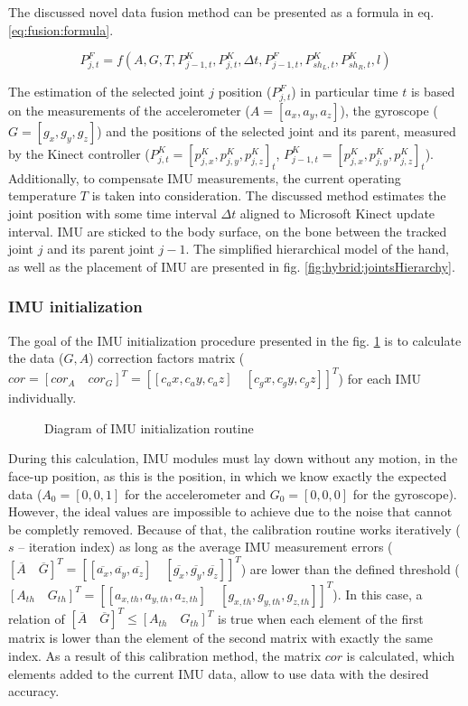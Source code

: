 \documentclass[sensors,article,submit,moreauthors,pdftex,10pt,a4paper]{mdpi}
\begin{document}
	The discussed novel data fusion method can be presented as a formula in eq. \ref{eq:fusion:formula}.
		
	\begin{equation}
		P^F_{j,t} = f(A,G,T,P_{j-1,t}^K,P_{j,t}^K,\Delta t, P^F_{j-1,t}, P^K_{sh_L,t},P^K_{sh_R,t},l) 
		\label{eq:fusion:formula}
	\end{equation}
		
	The estimation of the selected joint $j$ position ($P^F_{j,t}$) in particular time $t$ is based on the measurements of the accelerometer ($A=[a_x,a_y,a_z]$), the gyroscope ($G=[g_x,g_y,g_z]$) and the positions of the selected joint and its parent, measured by the Kinect controller ($P^K_{j,t} = [p^K_{j,x}, p^K_{j,y}, p^K_{j,z}]_t$, $P^K_{j-1,t} = [p^K_{j,x}, p^K_{j,y}, p^K_{j,z}]_t$). Additionally, to compensate IMU measurements, the current operating temperature $T$ is taken into consideration. The discussed method estimates the joint position with some time interval $\Delta t$ aligned to Microsoft Kinect update interval. IMU are sticked to the body surface, on the bone between the tracked joint $j$ and its parent joint $j-1$. The simplified hierarchical model of the hand, as well as the placement of IMU are presented in fig. \ref{fig:hybrid:jointsHierarchy}.	
		
	\subsubsection{IMU initialization}
	The goal of the IMU initialization procedure presented in the fig. \ref{fig:hybrid:IMUCalibration} is to calculate the data ($G, A$) correction factors matrix ($cor = [cor_A \quad cor_G]^T = [[c_ax,c_ay,c_az ]\quad[c_gx,c_gy,c_gz ]]^T $) for each IMU individually. 
	
	\begin{figure}[!htb]
		\scalebox{0.55}{		
			
		}
		\caption{Diagram of IMU initialization routine}
		\label{fig:hybrid:IMUCalibration}
	\end{figure}
	
	During this calculation, IMU modules must lay down without any motion, in the face-up position, as this is the position, in which we know exactly the expected data ($A_0=[0,0,1]$ for the accelerometer and $G_0=[0,0,0]$ for the gyroscope). However, the ideal values are impossible to achieve due to the noise that cannot be completly removed. Because of that, the calibration routine works iteratively ($s$ -- iteration index) as long as the average IMU measurement errors ($[\overline{A}\quad \overline{G}]^T = [[\overline{a_x},\overline{a_y},\overline{a_z}]\quad[\overline{g_x},\overline{g_y},\overline{g_z}]]^T$) are lower than the defined threshold ($[A_{th}\quad G_{th}]^T = [[a_{x,th},a_{y,th},a_{z,th}]\quad[g_{x,th},g_{y,th},g_{z,th}]]^T$). In this case, a relation of $[\overline{A}\quad \overline{G}]^T \le [A_{th}\quad G_{th}]^T$ is true when each element of the first matrix is lower than the element of the second matrix with exactly the same index. As a result of this calibration method, the matrix $cor$ is calculated, which elements added to the current IMU data, allow to use data with the desired accuracy. 
		
\end{document}
